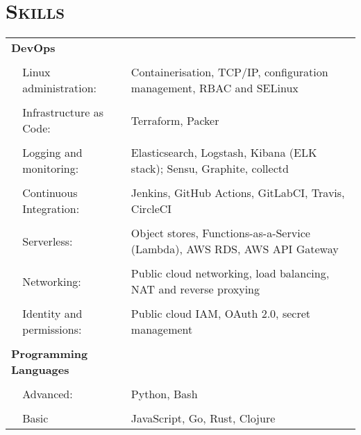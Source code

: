 \documentclass[a4paper,10pt]{article} %
\begin{document}
\section{\textsc{Skills}}
\begin{tabularx}{\textwidth}{p{0.3cm}|p{4cm}X}
\multicolumn{2}{l}{\textbf{DevOps}} & \\
\multicolumn{3}{c}{} \\ %
   & Linux administration:               & Containerisation, TCP/IP, configuration management, RBAC and SELinux \\
     \\
   & Infrastructure as Code:             & Terraform, Packer \\
     \\
   & Logging and monitoring:             & Elasticsearch, Logstash, Kibana (ELK stack); Sensu, Graphite, collectd \\
     \\
   & Continuous Integration:             & Jenkins, GitHub Actions, GitLabCI, Travis, CircleCI \\
     \\
   & Serverless:                         & Object stores, Functions-as-a-Service (Lambda), AWS RDS, AWS API Gateway \\
     \\
   & Networking:                         & Public cloud networking, load balancing, NAT and reverse proxying \\
     \\
   & Identity and permissions:           & Public cloud IAM, OAuth 2.0, secret management \\
\multicolumn{3}{c}{} \\ %
\multicolumn{2}{l}{\textbf{Programming Languages}}      & \\
\multicolumn{3}{c}{} \\ %
  &  Advanced:                           & Python, Bash \\
     \\
  &  Basic                               & JavaScript, Go, Rust, Clojure \\
\end{tabularx}

\end{document}
